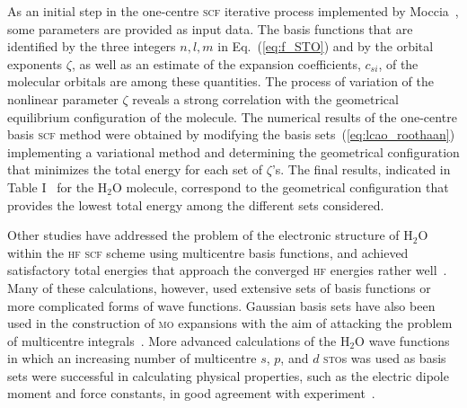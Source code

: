  
As an initial step in the one-centre \textsc{scf} iterative process
implemented by
Moccia~\cite{Moccia_JCP_2164,Moccia_JCP_2176,Moccia_1964}, some
parameters are provided as input data. The basis functions that are
identified by the three integers $n,l,m$ in Eq.~(\ref{eq:f_STO}) and
by the orbital exponents $\zeta$, as well as an estimate of the
expansion coefficients, $c_{si}$, of the molecular orbitals are among
these quantities. The process of variation of the nonlinear parameter
$\zeta$ reveals a strong correlation with the geometrical equilibrium
configuration of the molecule. The numerical results of the one-centre
basis \textsc{scf} method were obtained by modifying the basis
sets~(\ref{eq:lcao_roothaan}) implementing a variational method and
determining the geometrical configuration that minimizes the total
energy for each set of $\zeta$'s. The final results, indicated in
Table I~\cite{Moccia_1964} for the H$_{2}$O molecule, correspond to
the geometrical configuration that provides the lowest total energy
among the different sets considered.








Other studies have addressed the problem of the electronic structure
of H$_{2}$O within the \textsc{hf} \textsc{scf} scheme using
multicentre basis functions, and achieved satisfactory total energies
that approach the converged \textsc{hf} energies rather
well~\cite{natureH2O_1960, gaussianH2O_1965,
  Moccia_oneCenterHF_1967,Reeves_nature_1956}. Many of these
calculations, however, used extensive sets of basis functions or more
complicated forms of wave functions. Gaussian basis sets have also
been used in the construction of \textsc{mo} expansions with the aim
of attacking the problem of multicentre
integrals~\cite{gaussianH2O_1965,Neumann_gaussian_1968}. More advanced
calculations of the H$_{2}$O wave functions in which an increasing
number of multicentre $s$, $p$, and $d$ \textsc{sto}s was used as
basis sets were successful in calculating physical properties, such as
the electric dipole moment and force constants, in good agreement with
experiment~\cite{Pitzer_1968,Pitzer_1970}.











